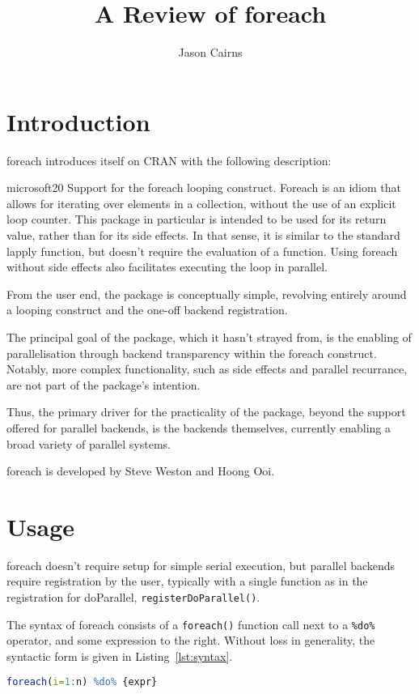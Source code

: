 \documentclass[a4paper,10pt]{article}
\begin{document}
\title{A Review of foreach}
\author{Jason Cairns}
  
\maketitle{}

\section{Introduction}
\label{sec:introduction}

foreach introduces itself on CRAN with the following description:
\begin{displaycquote}{microsoft20}
	Support for the foreach looping construct. Foreach is an idiom that
	allows for iterating over elements in a collection, without the use
	of an explicit loop counter. This package in particular is intended
	to be used for its return value, rather than for its side effects.
	In that sense, it is similar to the standard lapply function, but
	doesn't require the evaluation of a function. Using foreach without
	side effects also facilitates executing the loop in parallel.
\end{displaycquote}

From the user end, the package is conceptually simple, revolving
entirely around a looping construct and the one-off backend
registration.

The principal goal of the package, which it hasn't strayed from, is
the enabling of parallelisation through backend transparency within
the foreach construct. Notably, more complex functionality, such as
side effects and parallel recurrance, are not part of the package's
intention.

Thus, the primary driver for the practicality of the package, beyond
the support offered for parallel backends, is the backends themselves,
currently enabling a broad variety of parallel systems.

foreach is developed by Steve Weston and Hoong Ooi.

\section{Usage}
\label{sec:usage}

foreach doesn't require setup for simple serial execution, but
parallel backends require registration by the user, typically with a
single function as in the registration for doParallel,
\texttt{registerDoParallel()}.

The syntax of foreach consists of a \texttt{foreach()} function call
next to a \texttt{\%do\%} operator, and some expression to the
right\cite{weston19:_using}. Without loss in generality, the syntactic
form is given in Listing~\ref{lst:syntax}.
\begin{lstlisting}[caption={Standard foreach syntax},label=lst:syntax,language=R]
foreach(i=1:n) %do% {expr}
\end{lstlisting}
\end{document}
